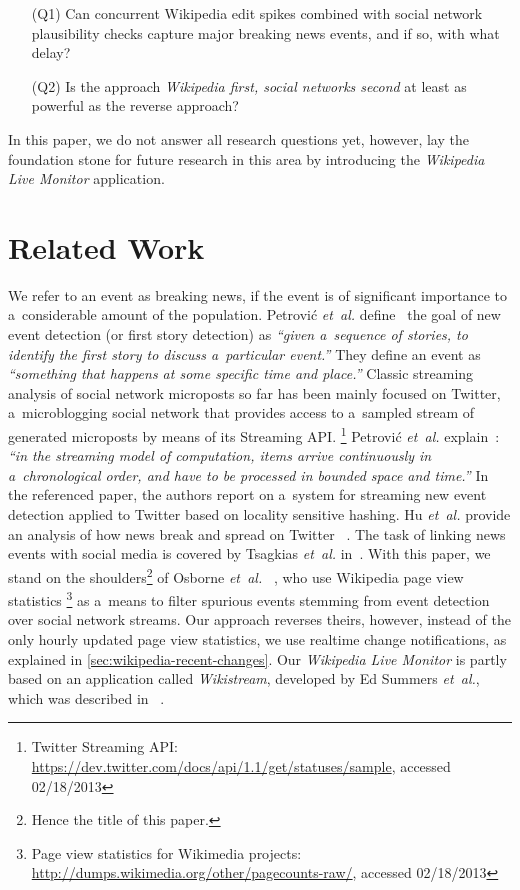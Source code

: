 \documentclass{www13-companion-accepted}
\newcommand{\inlinelistingsize}{\fontsize{8pt}{11pt}}
\let\oldurl\url
\renewcommand{\url}[1]{\inlinelistingsize\oldurl{#1}}
\begin{document}
\begin{itemize}
  \itemsep0em
  \item[(Q1)] Can concurrent Wikipedia edit spikes combined with
    social network plausibility checks capture major breaking news events,
    and if so, with what delay?
  \item[(Q2)] Is the approach \emph{Wikipedia first, social networks second}
    at least as powerful as the reverse approach?
\end{itemize}

In this paper, we do not answer all research questions yet,
however, lay the foundation stone for future research in this area
by introducing the \emph{Wikipedia Live Monitor} application.

\section{Related Work}

We refer to an event as breaking news, if the event is of significant importance
to a~considerable amount of the population.
Petrovi\'{c} \emph{et~al.} define~\cite{petrovic2010streamingfirststory}
the goal of new event detection (or first story detection) as
\textit{``given a~sequence of stories, to identify the first story
to discuss a~particular event.''}
They define an event as \textit{``something that happens
at some specific time and place.''}
Classic streaming analysis of social network microposts so far has been mainly
focused on Twitter, a~microblogging social network that provides access
to a~sampled stream of generated microposts by means of its Streaming API.%
\footnote{Twitter Streaming API:
\url{https://dev.twitter.com/docs/api/1.1/get/statuses/sample},
accessed 02/18/2013}
Petrovi\'{c} \emph{et~al.} explain~\cite{petrovic2010streamingfirststory}:
\textit{``in the streaming model of computation,
items arrive continuously in a~chronological order, and have to be
processed in bounded space and time.''}
In the referenced paper, the authors report on a~system for streaming
new event detection applied to Twitter based on locality sensitive hashing.
Hu \emph{et~al.} provide an analysis of how news break and spread on Twitter~%
\cite{hu2012breakingnews}.
The task of linking news events with social media is covered by Tsagkias
\emph{et~al.} in~\cite{tsagkias2011linkingonlinenews}.
With this paper, we stand on the shoulders\footnote{Hence the title of this paper.}
of Osborne \emph{et~al.}~%
\cite{osborne2012bieber}, who use Wikipedia page view statistics%
\footnote{Page view statistics for Wikimedia projects:
\url{http://dumps.wikimedia.org/other/pagecounts-raw/},
accessed 02/18/2013}
as a~means to filter spurious events
stemming from event detection over social network streams.
Our approach reverses theirs, however, instead of the only hourly updated
page view statistics, we use realtime change notifications,
as explained in \autoref{sec:wikipedia-recent-changes}.
Our \emph{Wikipedia Live Monitor} is partly based on an application called
\emph{Wikistream}, developed by Ed Summers \emph{et~al.}, which was described in~%
\cite{summers2011odetonode}.
\end{document}
